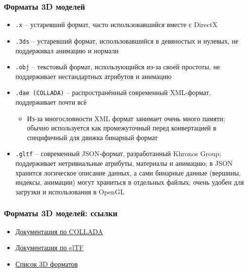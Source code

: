 \documentclass{beamer}
\begin{document}
\begin{frame}[fragile]
\frametitle{Форматы 3D моделей}
\begin{itemize}
\fontsize{8pt}{8pt}
\selectfont
\item \verb|.x| -- устаревший формат, часто использовавшийся вместе с DirectX
\pause
\item \verb|.3ds| -- устаревший формат, использовавшийся в девяностых и нулевых, не поддерживал анимацию и нормали
\pause
\item \verb|.obj| -- текстовый формат, использующийся из-за своей простоты, не поддерживает нестандартных атрибутов и анимацию
\pause
\item \verb|.dae (COLLADA)| -- распространённый современный XML-формат, поддерживает почти всё
\pause
\begin{itemize}
\fontsize{8pt}{8pt}
\selectfont
\item Из-за многословности XML формат занимает очень много памяти; обычно используется как промежуточный перед конвертацией в специфичный для движка бинарный формат
\end{itemize}
\pause
\item \verb|.gltf| -- современный JSON-формат, разработанный Khronos Group; поддерживает нетривиальные атрибуты, материалы и анимацию; в JSON хранится логическое описание данных, а сами бинарные данные (вершины, индексы, анимации) могут храниться в отдельных файлых; очень удобен для загрузки и использования в OpenGL
\end{itemize}
\end{frame}

\begin{frame}[fragile]
\frametitle{Форматы 3D моделей: ссылки}
\begin{itemize}
\item \href{https://www.khronos.org/collada}{Документация по COLLADA}
\item \href{https://registry.khronos.org/glTF/specs/2.0/glTF-2.0.html}{Документация по glTF}
\item \href{https://en.wikipedia.org/wiki/List_of_file_formats#3D_graphics}{Список 3D форматов}
\end{itemize}
\end{frame}
\end{document}
